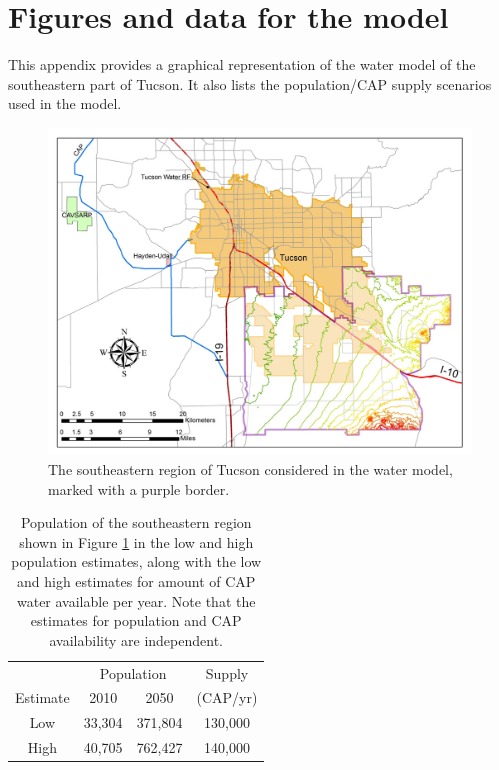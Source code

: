 \documentclass[12pt]{amsart}
\begin{document}
\pagebreak

\appendix

\section{Figures and data for the model}
\label{app:figures}
\FloatBarrier

\bigskip 

This appendix provides a graphical representation of the water model of the southeastern part of Tucson. It also lists the population/CAP supply scenarios used in the model.\medskip  

\begin{figure}[!ht]
	\centering
	\includegraphics[width=.8\textwidth]{images/tucson_elevation}
	\caption{
		The southeastern region of Tucson considered in the water model, marked with a purple border.
	}
	\label{fig:tucson_map}
\end{figure}


\begin{table}[!ht]
	\centering
	\begin{tabular}{|c|cc||c|}
		\hline
		& \multicolumn{2}{|c||}{Population} & Supply \\
		Estimate & 2010 & 2050 & (CAP/yr) \\
		\hline
		\hline
		Low  & 33,304 & 371,804 & 130,000 \\
		\hline
		High & 40,705 & 762,427 & 140,000 \\
		\hline
	\end{tabular}\medskip
	\caption{
		Population of the southeastern region shown in Figure \ref{fig:tucson_map} in the low and high population estimates, along with the low and high estimates for amount of CAP water available per year.
		Note that the estimates for population and CAP availability are independent.
	}
	\label{tab:scenario_description}
\end{table}
\end{document}
